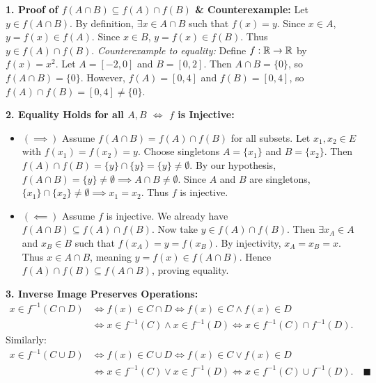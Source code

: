 \begin{solution}
\textbf{1. Proof of $f(A \cap B) \subseteq f(A) \cap f(B)$ \& Counterexample:}
Let $y \in f(A \cap B)$. By definition, $\exists x \in A \cap B$ such that $f(x) = y$.
Since $x \in A$, $y = f(x) \in f(A)$. Since $x \in B$, $y = f(x) \in f(B)$.
Thus $y \in f(A) \cap f(B)$.
\emph{Counterexample to equality:} Define $f: \mathbb{R} \to \mathbb{R}$ by $f(x) = x^2$.
Let $A = [-2, 0]$ and $B = [0, 2]$. Then $A \cap B = \{0\}$, so $f(A \cap B) = \{0\}$.
However, $f(A) = [0, 4]$ and $f(B) = [0, 4]$, so $f(A) \cap f(B) = [0, 4] \ne \{0\}$.

\textbf{2. Equality Holds for all $A, B$ $\iff$ $f$ is Injective:}
\begin{itemize}[leftmargin=1.5em,itemsep=2pt]
  \item $(\implies)$ Assume $f(A \cap B) = f(A) \cap f(B)$ for all subsets.
  Let $x_1, x_2 \in E$ with $f(x_1) = f(x_2) = y$. Choose singletons $A = \{x_1\}$ and $B = \{x_2\}$.
  Then $f(A) \cap f(B) = \{y\} \cap \{y\} = \{y\} \ne \emptyset$.
  By our hypothesis, $f(A \cap B) = \{y\} \ne \emptyset \implies A \cap B \ne \emptyset$.
  Since $A$ and $B$ are singletons, $\{x_1\} \cap \{x_2\} \ne \emptyset \implies x_1 = x_2$.
  Thus $f$ is injective.
  \item $(\impliedby)$ Assume $f$ is injective. We already have $f(A \cap B) \subseteq f(A) \cap f(B)$.
  Now take $y \in f(A) \cap f(B)$. Then $\exists x_A \in A$ and $x_B \in B$ such that $f(x_A) = y = f(x_B)$.
  By injectivity, $x_A = x_B = x$. Thus $x \in A \cap B$, meaning $y = f(x) \in f(A \cap B)$.
  Hence $f(A) \cap f(B) \subseteq f(A \cap B)$, proving equality.
\end{itemize}

\textbf{3. Inverse Image Preserves Operations:}
\begin{align*}
x \in f^{-1}(C \cap D) &\iff f(x) \in C \cap D \iff f(x) \in C \land f(x) \in D \\
&\iff x \in f^{-1}(C) \land x \in f^{-1}(D) \iff x \in f^{-1}(C) \cap f^{-1}(D).
\end{align*}
Similarly:
\begin{align*}
x \in f^{-1}(C \cup D) &\iff f(x) \in C \cup D \iff f(x) \in C \lor f(x) \in D \\
&\iff x \in f^{-1}(C) \lor x \in f^{-1}(D) \iff x \in f^{-1}(C) \cup f^{-1}(D). \quad \blacksquare
\end{align*}
\end{solution}

